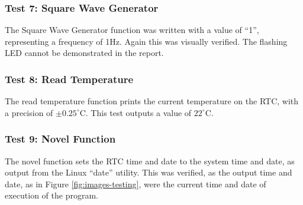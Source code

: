 \subsubsection{Test 7: Square Wave Generator}

The Square Wave Generator function was written with a value of ``1'',
representing a frequency of 1Hz. Again this was visually verified. The flashing
LED cannot be demonstrated in the report.

\subsubsection{Test 8: Read Temperature}

The read temperature function prints the current temperature on the RTC, with a
precision of $\pm 0.25^{\circ}$C. This test outputs a value of $22^{\circ}$C.

\subsubsection{Test 9: Novel Function}

The novel function sets the RTC time and date to the system time and date, as
output from the Linux ``date'' utility. This was verified, as the output time
and date, as in Figure \ref{fig:images-testing}, were the current time and date
of execution of the program.
